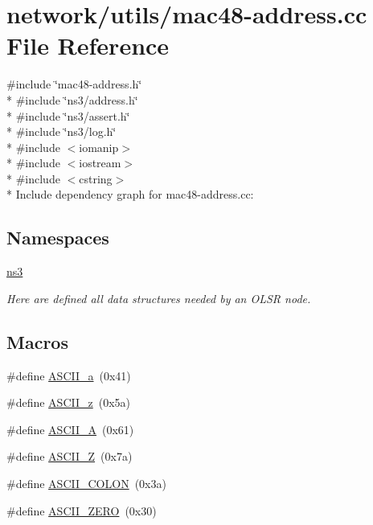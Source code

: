 \hypertarget{mac48-address_8cc}{}\section{network/utils/mac48-\/address.cc File Reference}
\label{mac48-address_8cc}
{\ttfamily \#include \char`\"{}mac48-\/address.\+h\char`\"{}}\\*
{\ttfamily \#include \char`\"{}ns3/address.\+h\char`\"{}}\\*
{\ttfamily \#include \char`\"{}ns3/assert.\+h\char`\"{}}\\*
{\ttfamily \#include \char`\"{}ns3/log.\+h\char`\"{}}\\*
{\ttfamily \#include $<$iomanip$>$}\\*
{\ttfamily \#include $<$iostream$>$}\\*
{\ttfamily \#include $<$cstring$>$}\\*
Include dependency graph for mac48-\/address.cc\+:
\subsection*{Namespaces}
\begin{DoxyCompactItemize}
\item 
 \hyperlink{namespacens3}{ns3}
\begin{DoxyCompactList}\small\item\em Here are defined all data structures needed by an O\+L\+SR node. \end{DoxyCompactList}\end{DoxyCompactItemize}
\subsection*{Macros}
\begin{DoxyCompactItemize}
\item 
\#define \hyperlink{mac48-address_8cc_acb0c7653dabe53da8a7fb03bcad505e7}{A\+S\+C\+I\+I\+\_\+a}~(0x41)
\item 
\#define \hyperlink{mac48-address_8cc_a76cb409bf2d31112b1bec0056271e3ce}{A\+S\+C\+I\+I\+\_\+z}~(0x5a)
\item 
\#define \hyperlink{mac48-address_8cc_a6ccdee41712ed103021e82cb944f47e6}{A\+S\+C\+I\+I\+\_\+A}~(0x61)
\item 
\#define \hyperlink{mac48-address_8cc_a282e9a9765b0ae5f0a4aa813c3a4932c}{A\+S\+C\+I\+I\+\_\+Z}~(0x7a)
\item 
\#define \hyperlink{mac48-address_8cc_aa13140b716dfb153353b2bf8be77d3f5}{A\+S\+C\+I\+I\+\_\+\+C\+O\+L\+ON}~(0x3a)
\item 
\#define \hyperlink{mac48-address_8cc_abde11a6ee98560227d0d3889da0408e4}{A\+S\+C\+I\+I\+\_\+\+Z\+E\+RO}~(0x30)
\end{DoxyCompactItemize}
